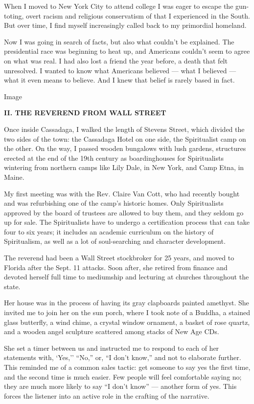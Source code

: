 When I moved to New York City to attend college I was eager to escape
the gun-toting, overt racism and religious conservatism of that I
experienced in the South. But over time, I find myself increasingly
called back to my primordial homeland.

Now I was going in search of facts, but also what couldn't be explained.
The presidential race was beginning to heat up, and Americans couldn't
seem to agree on what was real. I had also lost a friend the year
before, a death that felt unresolved. I wanted to know what Americans
believed --- what I believed --- what it even means to believe. And I
knew that belief is rarely based in fact.

Image

\textbf{II. THE REVEREND FROM WALL STREET}

Once inside Cassadaga, I walked the length of Stevens Street, which
divided the two sides of the town: the Cassadaga Hotel on one side, the
Spiritualist camp on the other. On the way, I passed wooden bungalows
with lush gardens, structures erected at the end of the 19th century as
boardinghouses for Spiritualists wintering from northern camps like Lily
Dale, in New York, and Camp Etna, in Maine.

My first meeting was with the Rev. Claire Van Cott, who had recently
bought and was refurbishing one of the camp's historic homes. Only
Spiritualists approved by the board of trustees are allowed to buy them,
and they seldom go up for sale. The Spiritualists have to undergo a
certification process that can take four to six years; it includes an
academic curriculum on the history of Spiritualism, as well as a lot of
soul-searching and character development.

The reverend had been a Wall Street stockbroker for 25 years, and moved
to Florida after the Sept. 11 attacks. Soon after, she retired from
finance and devoted herself full time to mediumship and lecturing at
churches throughout the state.

Her house was in the process of having its gray clapboards painted
amethyst. She invited me to join her on the sun porch, where I took note
of a Buddha, a stained glass butterfly, a wind chime, a crystal window
ornament, a basket of rose quartz, and a wooden angel sculpture
scattered among stacks of New Age CDs.

She set a timer between us and instructed me to respond to each of her
statements with, `Yes,'' ``No,'' or, ``I don't know,'' and not to
elaborate further. This reminded me of a common sales tactic: get
someone to say yes the first time, and the second time is much easier.
Few people will feel comfortable saying no; they are much more likely to
say ``I don't know'' --- another form of yes. This forces the listener
into an active role in the crafting of the narrative.

